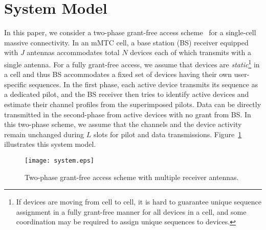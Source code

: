 \documentclass[journal]{IEEEtran}
\numberwithin{const2}{const}
\begin{document}
\section{System Model}
In this paper, we consider a two-phase grant-free access scheme~\cite{Liu:mimo, Liu:massive}
for a single-cell massive connectivity. 
In an mMTC cell, a base station (BS) receiver equipped with $J$ antennas
accommodates total $N$ devices each of which transmits with a single antenna.
For a fully grant-free access, %
we assume that devices are \emph{static}\footnote{
	If devices are moving from cell to cell, 
	it is hard to guarantee unique sequence assignment in a fully grant-free manner
	for all devices in a cell, and 
	some coordination may be required to assign unique sequences to devices.}
in a cell and thus BS accommodates a fixed set of devices
having their own user-specific sequences. 
In the first phase, each active device transmits its sequence as a dedicated pilot,
and the BS receiver then tries to identify active devices and estimate their channel profiles 
from the superimposed pilots.
Data can be directly transmitted in the second-phase from active devices with no grant from BS.
In this two-phase scheme, 
we assume that the channels and the device activity remain unchanged during $L$ slots for pilot 
and data transmissions.
Figure~\ref{fig:system} illustrates this system model.

\begin{figure}
	\centering
	\texttt{[image: system.eps]}
	\caption{Two-phase grant-free access scheme with multiple receiver antennas.}
	\label{fig:system}
\end{figure}
\end{document}
